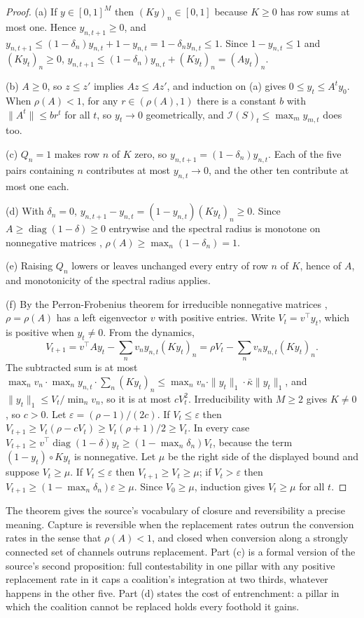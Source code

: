 \documentclass[11pt,letterpaper]{article}
\theoremstyle{definition}
\theoremstyle{remark}
\newcommand{\Integ}{\mathcal{I}}
\begin{document}
\begin{proof}
(a) If $y\in[0,1]^M$ then $(Ky)_n\in[0,1]$ because $K\ge0$ has row sums at most one. Hence $y_{n,t+1}\ge0$, and $y_{n,t+1}\le(1-\delta_n)y_{n,t}+1-y_{n,t}=1-\delta_ny_{n,t}\le1$. Since $1-y_{n,t}\le1$ and $(Ky_t)_n\ge0$, $y_{n,t+1}\le(1-\delta_n)y_{n,t}+(Ky_t)_n=(Ay_t)_n$.

(b) $A\ge0$, so $z\le z'$ implies $Az\le Az'$, and induction on (a) gives $0\le y_t\le A^ty_0$. When $\rho(A)<1$, for any $r\in(\rho(A),1)$ there is a constant $b$ with $\|A^t\|\le br^t$ for all $t$, so $y_t\to0$ geometrically, and $\Integ(S)_t\le\max_my_{m,t}$ does too.

(c) $Q_n=1$ makes row $n$ of $K$ zero, so $y_{n,t+1}=(1-\delta_n)y_{n,t}$. Each of the five pairs containing $n$ contributes at most $y_{n,t}\to0$, and the other ten contribute at most one each.

(d) With $\delta_n=0$, $y_{n,t+1}-y_{n,t}=(1-y_{n,t})(Ky_t)_n\ge0$. Since $A\ge\operatorname{diag}(1-\delta)\ge0$ entrywise and the spectral radius is monotone on nonnegative matrices \citep{horn2012}, $\rho(A)\ge\max_n(1-\delta_n)=1$.

(e) Raising $Q_n$ lowers or leaves unchanged every entry of row $n$ of $K$, hence of $A$, and monotonicity of the spectral radius applies.

(f) By the Perron-Frobenius theorem for irreducible nonnegative matrices \citep{horn2012}, $\rho=\rho(A)$ has a left eigenvector $v$ with positive entries. Write $V_t=v^{\top}y_t$, which is positive when $y_t\neq0$. From the dynamics,
\[
V_{t+1}=v^{\top}Ay_t-\sum_nv_ny_{n,t}(Ky_t)_n=\rho V_t-\sum_nv_ny_{n,t}(Ky_t)_n .
\]
The subtracted sum is at most $\max_nv_n\cdot\max_ny_{n,t}\cdot\sum_n(Ky_t)_n\le\max_nv_n\cdot\|y_t\|_1\cdot\bar\kappa\|y_t\|_1$, and $\|y_t\|_1\le V_t/\min_nv_n$, so it is at most $cV_t^2$. Irreducibility with $M\ge2$ gives $K\neq0$, so $c>0$. Let $\varepsilon=(\rho-1)/(2c)$. If $V_t\le\varepsilon$ then $V_{t+1}\ge V_t(\rho-cV_t)\ge V_t(\rho+1)/2\ge V_t$. In every case $V_{t+1}\ge v^{\top}\operatorname{diag}(1-\delta)y_t\ge(1-\max_n\delta_n)V_t$, because the term $(1-y_t)\circ Ky_t$ is nonnegative. Let $\mu$ be the right side of the displayed bound and suppose $V_t\ge\mu$. If $V_t\le\varepsilon$ then $V_{t+1}\ge V_t\ge\mu$; if $V_t>\varepsilon$ then $V_{t+1}\ge(1-\max_n\delta_n)\varepsilon\ge\mu$. Since $V_0\ge\mu$, induction gives $V_t\ge\mu$ for all $t$.
\end{proof}

The theorem gives the source's vocabulary of closure and reversibility a precise meaning. Capture is reversible when the replacement rates outrun the conversion rates in the sense that $\rho(A)<1$, and closed when conversion along a strongly connected set of channels outruns replacement. Part (c) is a formal version of the source's second proposition: full contestability in one pillar with any positive replacement rate in it caps a coalition's integration at two thirds, whatever happens in the other five. Part (d) states the cost of entrenchment: a pillar in which the coalition cannot be replaced holds every foothold it gains.
\end{document}
